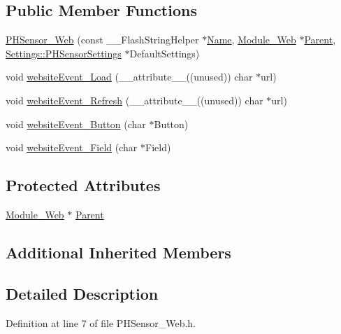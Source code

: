 \subsection*{Public Member Functions}
\begin{DoxyCompactItemize}
\item 
\hyperlink{class_p_h_sensor___web_a1620625830d29822b30407d064d207c5}{P\+H\+Sensor\+\_\+\+Web} (const \+\_\+\+\_\+\+Flash\+String\+Helper $\ast$\hyperlink{class_common_aeea91a726dbe988e515057b32ba0726f}{Name}, \hyperlink{class_module___web}{Module\+\_\+\+Web} $\ast$\hyperlink{class_p_h_sensor___web_aed4c44d8d7b1176ba92c7de9d76eb47f}{Parent}, \hyperlink{struct_settings_1_1_p_h_sensor_settings}{Settings\+::\+P\+H\+Sensor\+Settings} $\ast$Default\+Settings)
\item 
void \hyperlink{class_p_h_sensor___web_ad986c8800153e737e43fab3bd155b8af}{website\+Event\+\_\+\+Load} (\+\_\+\+\_\+attribute\+\_\+\+\_\+((unused)) char $\ast$url)
\item 
void \hyperlink{class_p_h_sensor___web_a73ad3c5be0e9dd8deaea4cf2eee654be}{website\+Event\+\_\+\+Refresh} (\+\_\+\+\_\+attribute\+\_\+\+\_\+((unused)) char $\ast$url)
\item 
void \hyperlink{class_p_h_sensor___web_a54944c4adb45f117e3e209f903cc5bec}{website\+Event\+\_\+\+Button} (char $\ast$Button)
\item 
void \hyperlink{class_p_h_sensor___web_a7e78a34b02adb20af3767c0db29a2dea}{website\+Event\+\_\+\+Field} (char $\ast$Field)
\end{DoxyCompactItemize}
\subsection*{Protected Attributes}
\begin{DoxyCompactItemize}
\item 
\hyperlink{class_module___web}{Module\+\_\+\+Web} $\ast$ \hyperlink{class_p_h_sensor___web_aed4c44d8d7b1176ba92c7de9d76eb47f}{Parent}
\end{DoxyCompactItemize}
\subsection*{Additional Inherited Members}


\subsection{Detailed Description}


Definition at line 7 of file P\+H\+Sensor\+\_\+\+Web.\+h.



